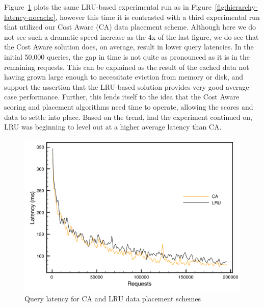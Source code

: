 Figure~\ref{fig:hierarchy-latency} plots the same LRU-based experimental run as
in Figure~\ref{fig:hierarchy-latency-nocache}, however this time it is
contrasted with a third experimental run that utilized our Cost Aware (CA)
data placement scheme. Although here we do not see such a dramatic speed
increase as the 4x of the last figure, we do see that the Cost Aware solution
does, on average, result in lower query latencies. In the initial 50,000
queries, the gap in time is not quite as pronounced as it is in the remaining
requests. This can be explained as the result of the cached data not having
grown large enough to necessitate eviction from memory or disk, and support the
assertion that the LRU-based solution provides very good average-case
performance. Further, this lends itself to the idea that the Cost Aware scoring
and placement algorithms need time to operate, allowing the scores and data to
settle into place. Based on the trend, had the experiment continued on, LRU was
beginning to level out at a higher average latency than CA.

\begin{figure}
\begin{center}
\includegraphics[scale=0.5]{figures/hierarchy-latency.pdf}
\end{center}
\caption{Query latency for CA and LRU data placement schemes}
\label{fig:hierarchy-latency}
\end{figure}

